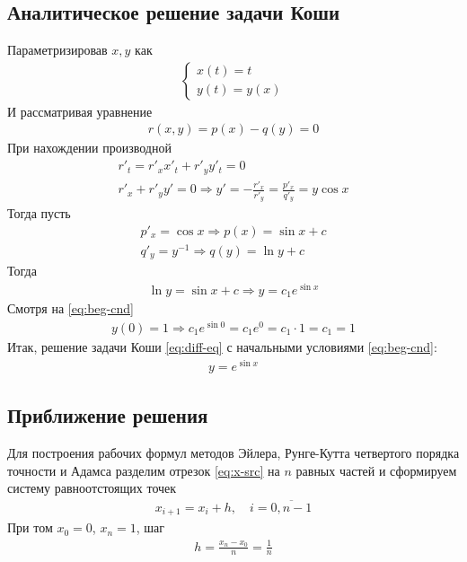 \subsection{Аналитическое решение задачи Коши}
Параметризировав \(x, y\) как
\begin{align}
	\begin{cases}
		x(t) = t \\
		y(t) = y(x)
	\end{cases}
\end{align}
И рассматривая уравнение
\begin{align}
	r(x, y) = p(x) - q(y) = 0
\end{align}
При нахождении производной
\begin{align}
	r'_t = r'_x x'_t + r'_y y'_t = 0 \\
	r'_x + r'_y y' = 0 \Longrightarrow y' = -\frac{r'_x}{r'_y} = \frac{p'_x}{q'_y} = y \cos x
\end{align}
Тогда пусть
\begin{align}
	p'_x = \cos x \Longrightarrow p(x) = \sin x + c \\
	q'_y = y^{-1} \Longrightarrow q(y) = \ln y + c
\end{align}
Тогда
\begin{align}
	\ln y = \sin x + c \Longrightarrow y = c_1 e^{\sin x}
\end{align}
Смотря на \cref{eq:beg-cnd}
\begin{align}
	y(0) = 1 \Longrightarrow c_1 e^{\sin 0} = c_1 e^0 = c_1 \cdot 1 = c_1 = 1
\end{align}
Итак, решение задачи Коши \cref{eq:diff-eq} с начальными условиями \cref{eq:beg-cnd}:
\begin{align}
	y = e^{\sin x}
\end{align}
\subsection{Приближение решения}
Для построения рабочих формул методов Эйлера, Рунге-Кутта четвертого порядка точности и Адамса разделим отрезок \cref{eq:x-src} на \(n\) равных частей и сформируем систему равноотстоящих точек
\begin{align}
	x_{i+1} = x_i + h,\quad i = \overline{0, n - 1}
\end{align}
При том \(x_0 = 0\), \(x_n = 1\), шаг
\begin{align}
	h = \frac{x_n - x_0}{n} = \frac{1}{n}
\end{align}
